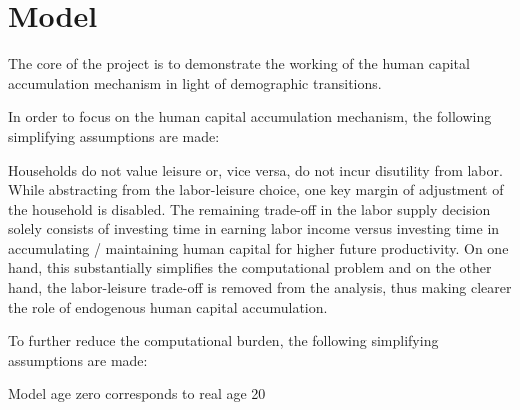 \section{Model}
\label{sec:model}

The core of the project is to demonstrate the working of the human capital accumulation mechanism in light of demographic transitions.

In order to focus on the human capital accumulation mechanism, the following simplifying assumptions are made:

Households do not value leisure or, vice versa, do not incur disutility from labor. While abstracting from the labor-leisure choice, one key margin of adjustment of the household is disabled. The remaining trade-off in the labor supply decision solely consists of investing time in earning labor income versus investing time in accumulating / maintaining human capital for higher future productivity. On one hand, this substantially simplifies the computational problem and on the other hand, the labor-leisure trade-off is removed from the analysis, thus making clearer the role of endogenous human capital accumulation.



To further reduce the computational burden, the following simplifying assumptions are made:

Model age zero corresponds to real age 20